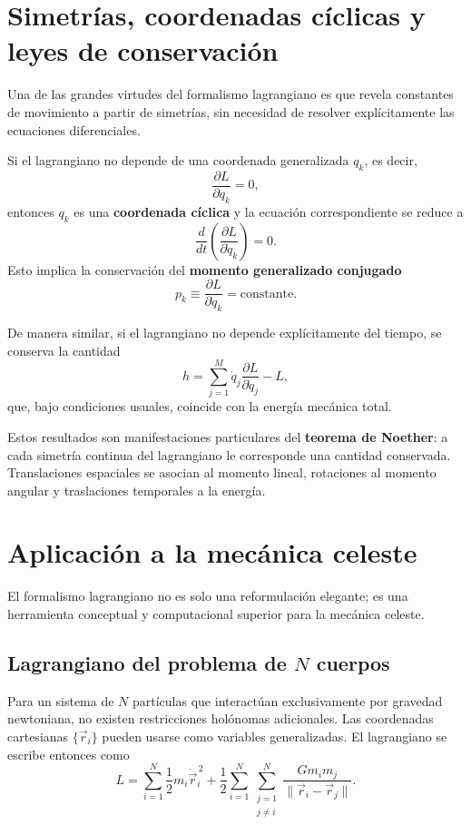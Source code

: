 \section{Simetrías, coordenadas cíclicas y leyes de conservación}
Una de las grandes virtudes del formalismo lagrangiano es que revela constantes de movimiento a partir de simetrías, sin necesidad de resolver explícitamente las ecuaciones diferenciales.

Si el lagrangiano no depende de una coordenada generalizada \(q_k\), es decir,
\[
\frac{\partial L}{\partial q_k}=0,
\]
entonces \(q_k\) es una \textbf{coordenada cíclica} y la ecuación correspondiente se reduce a
\[
\frac{d}{dt}\left(\frac{\partial L}{\partial \dot{q}_k}\right)=0.
\]
Esto implica la conservación del \textbf{momento generalizado conjugado}
\[
p_k \equiv \frac{\partial L}{\partial \dot{q}_k} = \text{constante}.
\]

De manera similar, si el lagrangiano no depende explícitamente del tiempo, se conserva la cantidad
\[
h = \sum_{j=1}^{M}\dot{q}_j\frac{\partial L}{\partial \dot{q}_j} - L,
\]
que, bajo condiciones usuales, coincide con la energía mecánica total.

Estos resultados son manifestaciones particulares del \textbf{teorema de Noether}: a cada simetría continua del lagrangiano le corresponde una cantidad conservada. Translaciones espaciales se asocian al momento lineal, rotaciones al momento angular y traslaciones temporales a la energía.

\section{Aplicación a la mecánica celeste}
El formalismo lagrangiano no es solo una reformulación elegante; es una herramienta conceptual y computacional superior para la mecánica celeste.

\subsection{Lagrangiano del problema de \texorpdfstring{$N$}{N} cuerpos}
Para un sistema de \(N\) partículas que interactúan exclusivamente por gravedad newtoniana, no existen restricciones holónomas adicionales. Las coordenadas cartesianas \(\{\vec{r}_i\}\) pueden usarse como variables generalizadas. El lagrangiano se escribe entonces como
\[
L = \sum_{i=1}^{N}\frac{1}{2}m_i\dot{\vec{r}}_i^{\,2} + \frac{1}{2}\sum_{i=1}^{N}\sum_{\substack{j=1 \\ j \neq i}}^{N}\frac{Gm_im_j}{\|\vec{r}_i-\vec{r}_j\|}.
\]

